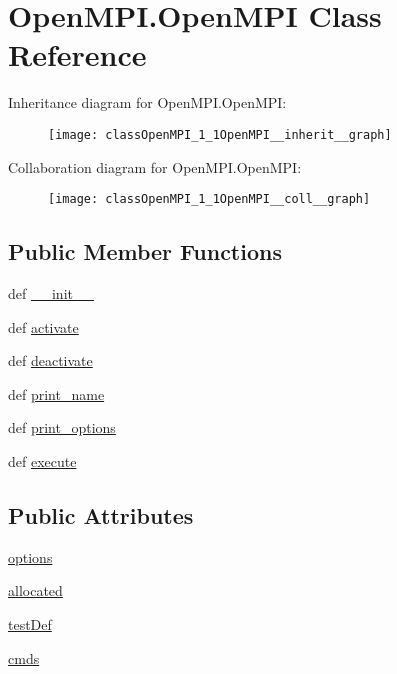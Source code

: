 \hypertarget{classOpenMPI_1_1OpenMPI}{\section{Open\-M\-P\-I.\-Open\-M\-P\-I Class Reference}
\label{classOpenMPI_1_1OpenMPI}
}


Inheritance diagram for Open\-M\-P\-I.\-Open\-M\-P\-I\-:\nopagebreak
\begin{figure}[H]
\begin{center}
\leavevmode
\texttt{[image: classOpenMPI\_1\_1OpenMPI\_\_inherit\_\_graph]}
\end{center}
\end{figure}


Collaboration diagram for Open\-M\-P\-I.\-Open\-M\-P\-I\-:\nopagebreak
\begin{figure}[H]
\begin{center}
\leavevmode
\texttt{[image: classOpenMPI\_1\_1OpenMPI\_\_coll\_\_graph]}
\end{center}
\end{figure}
\subsection*{Public Member Functions}
\begin{DoxyCompactItemize}
\item 
def \hyperlink{classOpenMPI_1_1OpenMPI_a98c85be81f92e692e8087d08c45ebd09}{\-\_\-\-\_\-init\-\_\-\-\_\-}
\item 
def \hyperlink{classOpenMPI_1_1OpenMPI_a446b9a62139dfc9065f4cc21450ed7f9}{activate}
\item 
def \hyperlink{classOpenMPI_1_1OpenMPI_ae235afe3cd4dfc210b7e8d045a108e5b}{deactivate}
\item 
def \hyperlink{classOpenMPI_1_1OpenMPI_a3b39e0c05069fd14533b0a528ac58001}{print\-\_\-name}
\item 
def \hyperlink{classOpenMPI_1_1OpenMPI_a6a912a2ac2d80ba6ac2d6595aa661268}{print\-\_\-options}
\item 
def \hyperlink{classOpenMPI_1_1OpenMPI_a4339bc2f6d52dce9bdd0818e7ce686d2}{execute}
\end{DoxyCompactItemize}
\subsection*{Public Attributes}
\begin{DoxyCompactItemize}
\item 
\hyperlink{classOpenMPI_1_1OpenMPI_a4a263774614f0b83a63a26639b46b2f5}{options}
\item 
\hyperlink{classOpenMPI_1_1OpenMPI_a9ffab4795264fde34d136269026204db}{allocated}
\item 
\hyperlink{classOpenMPI_1_1OpenMPI_acd20b78013350c2363484589ef85b67c}{test\-Def}
\item 
\hyperlink{classOpenMPI_1_1OpenMPI_a86be93bbc775c81263813274a8564efc}{cmds}
\end{DoxyCompactItemize}


